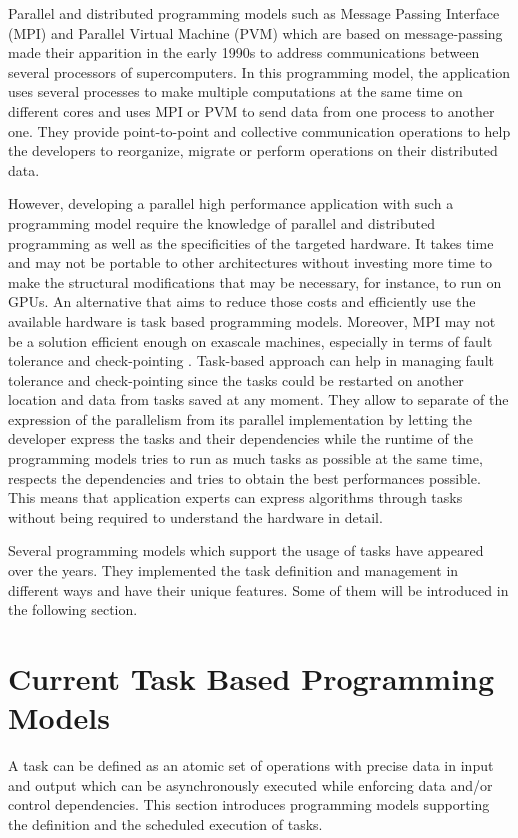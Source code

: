 Parallel and distributed programming models such as Message Passing Interface (MPI) \cite{MPIForum} and Parallel Virtual Machine (PVM) \cite{GBDJM1995} which are based on message-passing made their apparition in the early 1990s to address communications between several processors of supercomputers.
In this programming model, the application uses several processes to make multiple computations at the same time on different cores and uses MPI or PVM to send data from one process to another one.
They provide point-to-point and collective communication operations to help the developers to reorganize, migrate or perform operations on their distributed data.

However, developing a parallel high performance application with such a programming model require the knowledge of parallel and distributed programming as well as the specificities of the targeted hardware.
It takes time and may not be portable to other architectures without investing more time to make the structural modifications that may be necessary, for instance, to run on GPUs.
An alternative that aims to reduce those costs and efficiently use the available hardware is task based programming models.
Moreover, MPI may not be a solution efficient enough on exascale machines, especially in terms of fault tolerance and check-pointing \cite{SWAAB2014}.
Task-based approach can help in managing fault tolerance and check-pointing since the tasks could be restarted on another location and data from tasks saved at any moment.
They allow to separate of the expression of the parallelism from its parallel implementation by letting the developer express the tasks and their dependencies while the runtime of the programming models tries to run as much tasks as possible at the same time, respects the dependencies and tries to obtain the best performances possible.
This means that application experts can express algorithms through tasks without being required to understand the hardware in detail.

Several programming models which support the usage of tasks have appeared over the years.
They implemented the task definition and management in different ways and have their unique features.
Some of them will be introduced in the following section.


\section{Current Task Based Programming Models}
A task can be defined as an atomic set of operations with precise data in input and output which can be asynchronously executed while enforcing data and/or control dependencies.
This section introduces programming models supporting the definition and the scheduled execution of tasks.

